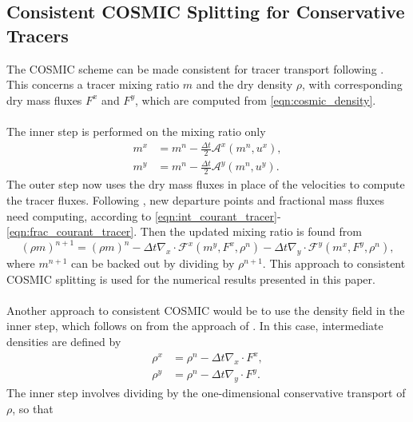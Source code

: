 \documentclass[11pt,a4paper]{article}
\begin{document}
\subsection{Consistent COSMIC Splitting for Conservative Tracers} \label{sec:cosmic_tracer}
The COSMIC scheme can be made consistent for tracer transport following \cite{lin1996ffsl}.
This concerns a tracer mixing ratio $m$ and the dry density $\rho$, with corresponding dry mass fluxes $F^x$ and $F^y$, which are computed from \eqref{eqn:cosmic_density}. \\ 
\\
The inner step is performed on the mixing ratio only
\begin{subequations}
\begin{align}
    m^x &= m^n - \frac{\Delta{t}}{2} \mathcal{A}^x(m^n, u^x), \\
    m^y &= m^n - \frac{\Delta{t}}{2} \mathcal{A}^y(m^n, u^y).
\end{align}
\end{subequations}
The outer step now uses the dry mass fluxes in place of the velocities to compute the tracer fluxes.
Following \citet{skamarock2006limiters}, new departure points and fractional mass fluxes need computing, according to \eqref{eqn:int_courant_tracer}-\eqref{eqn:frac_courant_tracer}.
Then the updated mixing ratio is found from
\begin{equation} \label{eqn:cosmic_tracer_end}
   (\rho m)^{n+1} = (\rho m)^{n} - \Delta{t} \nabla_x\cdot \mathcal{F}^x(m^y,F^x,\rho^n) - \Delta{t} \nabla_y\cdot \mathcal{F}^y(m^x,F^y,\rho^n),
\end{equation}
where $m^{n+1}$ can be backed out by dividing by $\rho^{n+1}$. This approach to consistent COSMIC splitting is used for the numerical results presented in this paper. \\
\\
Another approach to consistent COSMIC would be to use the density field in the inner step, which follows on from the approach of \citet{skamarock2006limiters}.
In this case, intermediate densities are defined by
\begin{subequations}
\begin{align}
    \rho^x &= \rho^n - \Delta{t} \nabla_x\cdot F^x, \\
    \rho^y &= \rho^n - \Delta{t} \nabla_y\cdot F^y.    
\end{align}
\end{subequations}
The inner step involves dividing by the one-dimensional conservative transport of $\rho$, so that
\end{document}
